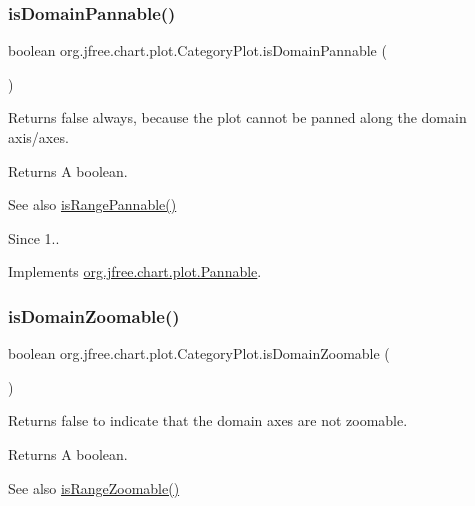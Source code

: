 \subsubsection{\texorpdfstring{is\+Domain\+Pannable()}{isDomainPannable()}}
{\footnotesize\ttfamily boolean org.\+jfree.\+chart.\+plot.\+Category\+Plot.\+is\+Domain\+Pannable (\begin{DoxyParamCaption}{ }\end{DoxyParamCaption})}

Returns {\ttfamily false} always, because the plot cannot be panned along the domain axis/axes.

\begin{DoxyReturn}{Returns}
A boolean.
\end{DoxyReturn}
\begin{DoxySeeAlso}{See also}
\mbox{\hyperlink{classorg_1_1jfree_1_1chart_1_1plot_1_1_category_plot_ae919889b6b612a6f5df7f204a3356d19}{is\+Range\+Pannable()}}
\end{DoxySeeAlso}
\begin{DoxySince}{Since}
1.. 
\end{DoxySince}


Implements \mbox{\hyperlink{interfaceorg_1_1jfree_1_1chart_1_1plot_1_1_pannable_a732908d75e7c0b1fab688d9a29ff3e44}{org.\+jfree.\+chart.\+plot.\+Pannable}}.

\mbox{\label{classorg_1_1jfree_1_1chart_1_1plot_1_1_category_plot_a6a2b57b6fac55866636c24ea8fa92469}} 
\subsubsection{\texorpdfstring{is\+Domain\+Zoomable()}{isDomainZoomable()}}
{\footnotesize\ttfamily boolean org.\+jfree.\+chart.\+plot.\+Category\+Plot.\+is\+Domain\+Zoomable (\begin{DoxyParamCaption}{ }\end{DoxyParamCaption})}

Returns {\ttfamily false} to indicate that the domain axes are not zoomable.

\begin{DoxyReturn}{Returns}
A boolean.
\end{DoxyReturn}
\begin{DoxySeeAlso}{See also}
\mbox{\hyperlink{classorg_1_1jfree_1_1chart_1_1plot_1_1_category_plot_ae3587c02157e69eeb8909513982e3d23}{is\+Range\+Zoomable()}} 
\end{DoxySeeAlso}


